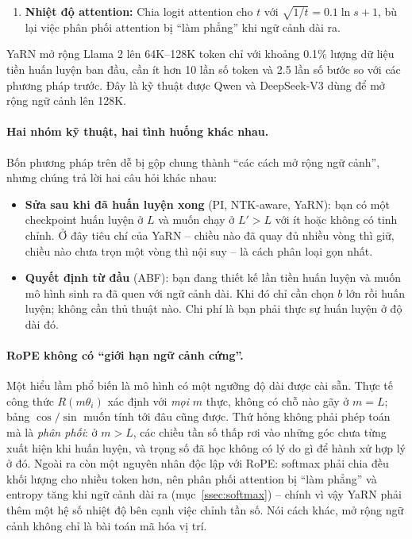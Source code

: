 \begin{itemize}
\begin{enumerate}
\[		\]
		Chiều quay nhiều vòng ($r > \beta$) được \emph{giữ nguyên}; chiều chưa quay hết một vòng ($r < \alpha$) được \emph{nội suy} như PI; ở giữa thì pha trộn tuyến tính (với Llama, tác giả dùng $\alpha=1, \beta=32$).
		\item \textbf{Nhiệt độ attention:} Chia logit attention cho $t$ với $\sqrt{1/t} = 0.1 \ln s + 1$, bù lại việc phân phối attention bị “làm phẳng” khi ngữ cảnh dài ra.
	\end{enumerate}
	YaRN mở rộng Llama 2 lên 64K--128K token chỉ với khoảng 0.1\% lượng dữ liệu tiền huấn luyện ban đầu, cần ít hơn 10 lần số token và 2.5 lần số bước so với các phương pháp trước. Đây là kỹ thuật được Qwen và DeepSeek-V3 dùng để mở rộng ngữ cảnh lên 128K.
\end{itemize}

\paragraph{Hai nhóm kỹ thuật, hai tình huống khác nhau.} Bốn phương pháp trên dễ bị gộp chung thành “các cách mở rộng ngữ cảnh”, nhưng chúng trả lời hai câu hỏi khác nhau:
\begin{itemize}
	\item \textbf{Sửa sau khi đã huấn luyện xong} (PI, NTK-aware, YaRN): bạn có một checkpoint huấn luyện ở $L$ và muốn chạy ở $L' > L$ với ít hoặc không có tinh chỉnh. Ở đây tiêu chí của YaRN -- chiều nào đã quay đủ nhiều vòng thì giữ, chiều nào chưa trọn một vòng thì nội suy -- là cách phân loại gọn nhất.
	\item \textbf{Quyết định từ đầu} (ABF): bạn đang thiết kế lần tiền huấn luyện và muốn mô hình sinh ra đã quen với ngữ cảnh dài. Khi đó chỉ cần chọn $b$ lớn rồi huấn luyện; không cần thủ thuật nào. Chi phí là bạn phải thực sự huấn luyện ở độ dài đó.
\end{itemize}

\paragraph{RoPE không có “giới hạn ngữ cảnh cứng”.} Một hiểu lầm phổ biến là mô hình có một ngưỡng độ dài được cài sẵn. Thực tế công thức $R(m\theta_i)$ xác định với \emph{mọi} $m$ thực, không có chỗ nào gãy ở $m = L$; bảng $\cos/\sin$ muốn tính tới đâu cũng được. Thứ hỏng không phải phép toán mà là \emph{phân phối}: ở $m > L$, các chiều tần số thấp rơi vào những góc chưa từng xuất hiện khi huấn luyện, và trọng số đã học không có lý do gì để hành xử hợp lý ở đó. Ngoài ra còn một nguyên nhân độc lập với RoPE: softmax phải chia đều khối lượng cho nhiều token hơn, nên phân phối attention bị “làm phẳng” và entropy tăng khi ngữ cảnh dài ra (mục~\ref{ssec:softmax}) -- chính vì vậy YaRN phải thêm một hệ số nhiệt độ bên cạnh việc chỉnh tần số. Nói cách khác, mở rộng ngữ cảnh không chỉ là bài toán mã hóa vị trí.

